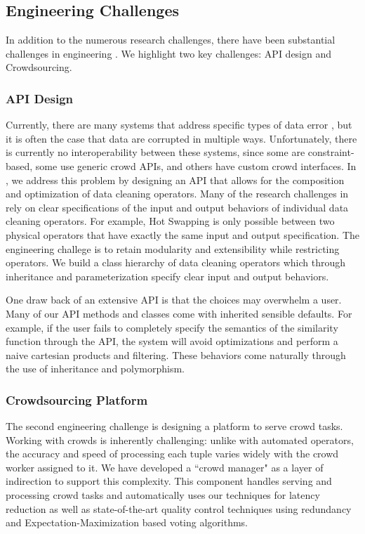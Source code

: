 \subsection{Engineering Challenges}
In addition to the numerous research challenges, there have been substantial challenges in engineering \sys.
We highlight two key challenges: API design and Crowdsourcing.

\subsubsection{API Design}
Currently, there are many systems that address specific types of data error \cite{gokhale2014corleone,park2014crowdfill,eracer,chen2014integrating}, but it is often 
the case that data are corrupted in multiple ways.
Unfortunately, there is currently no interoperability between these systems, since some are constraint-based, some use generic crowd APIs, and others have custom crowd interfaces.
In \sys, we address this problem by designing an API that allows for the composition and optimization of data cleaning operators.
Many of the research challenges in \sys rely on clear specifications of the input and output behaviors of
individual data cleaning operators.
For example, Hot Swapping is only possible between two physical operators that have exactly the same input and output specification.
The engineering challege is to retain modularity and extensibility while restricting operators.
We build a class hierarchy of data cleaning operators which through inheritance and parameterization specify clear input and output behaviors.

One draw back of an extensive API is that the choices may overwhelm a user.
Many of our API methods and classes come with inherited sensible defaults.
For example, if the user fails to completely specify the semantics of the similarity function through the API, 
the system will avoid optimizations and perform a naive cartesian products and filtering.
These behaviors come naturally through the use of inheritance and polymorphism.

\subsubsection{Crowdsourcing Platform}
The second engineering challenge is designing a platform to serve crowd tasks.
Working with crowds is inherently challenging: unlike with automated operators, the accuracy and speed of processing each tuple varies widely with the crowd worker assigned to it.
We have developed a ``crowd manager" as a layer of indirection to support this complexity.
This component handles serving and processing crowd tasks and automatically uses our techniques for latency reduction as well as state-of-the-art quality control techniques using redundancy and Expectation-Maximization based voting algorithms.

